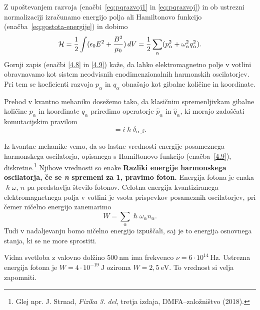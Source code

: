 Z upoštevanjem razvoja (enačbi~\ref{eq:pqrazvoj1} in \ref{eq:pqrazvoj}) in ob ustrezni
normalizaciji izračunamo energijo 
polja ali Hamiltonovo 
funkcijo (enačba~\ref{eq:gostota-energije}) in dobimo
\begin{equation}
{\cal H}=\frac{1}{2}\int(\epsilon_{0}E^{2}+\frac{B^{2}}{\mu_0})\, 
dV=\frac{1}{2}\sum_{\alpha}(p_{\alpha}^{2}+\omega_{\alpha}^{2}q_{\alpha}^{2}).
\label{4.9}
\end{equation}
Gornji zapis (enačbi \ref{4.8} in \ref{4.9}) kaže, 
da lahko elektromagnetno polje v votlini
obravnavamo kot sistem neodvisnih enodimenzionalnih harmonskih oscilatorjev. 
Pri tem se koeficienti razvoja $p_{\alpha}$ in $q_{\alpha}$ obnašajo kot
gibalne količine in koordinate.

Prehod v kvantno mehaniko dosežemo tako, da klasičnim spremenljivkam gibalne količine $p_{\alpha}$
in koordinate $q_{\alpha}$ priredimo operatorje $\hat{p}_{\alpha}$ in $\hat{q}_{\alpha}$,
ki morajo zadoščati komutacijskim pravilom 
\begin{equation}
[\hat{q}_{\alpha},\hat{p}_{\beta}]=i\hslash \delta_{\alpha, \beta}.
\label{4.10}
\end{equation}

Iz kvantne mehanike vemo, da so lastne vrednosti energije posameznega harmonskega oscilatorja, 
opisanega s Hamiltonovo funkcijo (enačba~\ref{4.9}), diskretne.\footnote{Glej npr. J. Strnad, 
{\it Fizika 3. del}, tretja izdaja, DMFA--založništvo (2018).} Njihove vrednosti so 
enake
{\bf Razliki energije harmonskega oscilatorja, če se \textit{\textbf{n}}
spremeni za 1, pravimo foton.} Energija
fotona je enaka $\hslash \omega$, $n$ pa predstavlja število fotonov. Celotna
energija kvantiziranega elektro\-magnetnega polja v votlini je vsota prispevkov
posameznih oscilatorjev, pri čemer ničelno energijo zanemarimo
\begin{equation}
W = \sum_\alpha \hslash \omega_\alpha n_\alpha.
\end{equation}
Tudi v nadaljevanju bomo ničelno energijo izpuščali, 
saj je to energija osnovnega stanja, ki se ne more sprostiti. 

\begin{remark}
Vidna svetloba z valovno dolžino $500~\si{\nano\metre}$ ima frekvenco
$\nu = 6 \cdot 10^{14}~\si{\hertz}$. Ustrezna energija fotona je
$W = 4 \cdot 10^{-19}~\si{\joule}$ oziroma $W = 2,5~\mathrm{e}\si{\volt}$.
To vrednost si velja zapomniti.
\end{remark}

